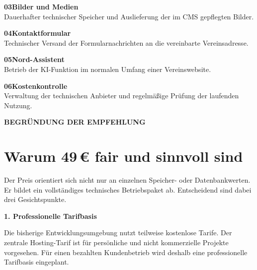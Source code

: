 \documentclass[11pt,a4paper]{article}
\newcommand{\eur}[1]{#1\,€}
\newcommand{\eyebrow}[1]{%
  {\sffamily\footnotesize\bfseries\color{NordBlue}\MakeUppercase{#1}}\\[2mm]
}
\begin{document}
\vspace{3mm}
\noindent
\begin{minipage}[t]{0.487\textwidth}
  \begin{servicebox}
    {\sffamily\bfseries\color{NordBlue}03\quad Bilder und Medien}\\[2mm]
    Dauerhafter technischer Speicher und Auslieferung der im CMS gepflegten Bilder.
  \end{servicebox}
\end{minipage}\hfill
\begin{minipage}[t]{0.487\textwidth}
  \begin{servicebox}
    {\sffamily\bfseries\color{NordBlue}04\quad Kontaktformular}\\[2mm]
    Technischer Versand der Formularnachrichten an die vereinbarte Vereinsadresse.
  \end{servicebox}
\end{minipage}

\vspace{3mm}
\noindent
\begin{minipage}[t]{0.487\textwidth}
  \begin{servicebox}
    {\sffamily\bfseries\color{NordBlue}05\quad Nord-Assistent}\\[2mm]
    Betrieb der KI-Funktion im normalen Umfang einer Vereinswebsite.
  \end{servicebox}
\end{minipage}\hfill
\begin{minipage}[t]{0.487\textwidth}
  \begin{servicebox}
    {\sffamily\bfseries\color{NordBlue}06\quad Kostenkontrolle}\\[2mm]
    Verwaltung der technischen Anbieter und regelmäßige Prüfung der laufenden Nutzung.
  \end{servicebox}
\end{minipage}

\newpage

\eyebrow{Begründung der Empfehlung}
\section{Warum \texorpdfstring{\eur{49}}{49 Euro} fair und sinnvoll sind}

Der Preis orientiert sich nicht nur an einzelnen Speicher- oder Datenbankwerten. Er bildet ein vollständiges technisches Betriebspaket ab. Entscheidend sind dabei drei Gesichtspunkte.

\begin{reasonbox}
  {\sffamily\large\bfseries\color{NordNavy}1. Professionelle Tarifbasis}

  Die bisherige Entwicklungsumgebung nutzt teilweise kostenlose Tarife. Der zentrale Hosting-Tarif ist für persönliche und nicht kommerzielle Projekte vorgesehen. Für einen bezahlten Kundenbetrieb wird deshalb eine professionelle Tarifbasis eingeplant.
\end{reasonbox}
\end{document}

